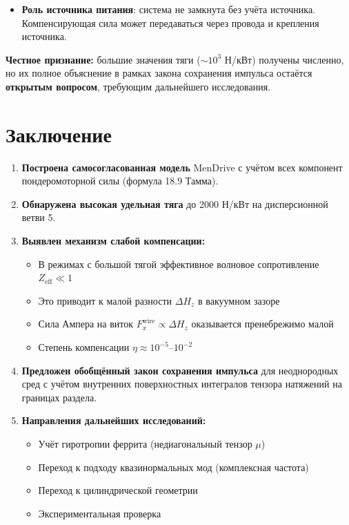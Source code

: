 \documentclass[a4paper,12pt]{article}
\begin{document}
{\begin{itemize}
    \item \textbf{Роль источника питания}: система не замкнута без учёта
    источника. Компенсирующая сила может передаваться через провода и
    крепления источника.
\end{itemize}

\textbf{Честное признание:} большие значения тяги ($\sim 10^3$ Н/кВт)
получены численно, но их полное объяснение в рамках закона сохранения
импульса остаётся \textbf{открытым вопросом}, требующим дальнейшего
исследования.

\section{Заключение}

\begin{enumerate}
    \item \textbf{Построена самосогласованная модель} MenDrive с учётом всех
    компонент пондеромоторной силы (формула 18.9 Тамма).
    
    \item \textbf{Обнаружена высокая удельная тяга} до 2000 Н/кВт на
    дисперсионной ветви 5.
    
    \item \textbf{Выявлен механизм слабой компенсации:}
    \begin{itemize}
        \item В режимах с большой тягой эффективное волновое сопротивление
        $Z_{\text{eff}} \ll 1$
        \item Это приводит к малой разности $\Delta H_z$ в вакуумном зазоре
        \item Сила Ампера на виток $F_x^{\text{wire}} \propto \Delta H_z$ 
        оказывается пренебрежимо малой
        \item Степень компенсации $\eta \approx 10^{-5}$--$10^{-2}$
    \end{itemize}
    
    \item \textbf{Предложен обобщённый закон сохранения импульса} для
    неоднородных сред с учётом внутренних поверхностных интегралов тензора
    натяжений на границах раздела.
    
    \item \textbf{Направления дальнейших исследований:}
    \begin{itemize}
        \item Учёт гиротропии феррита (недиагональный тензор $\mu$)
        \item Переход к подходу квазинормальных мод (комплексная частота)
        \item Переход к цилиндрической геометрии
        \item Экспериментальная проверка
    \end{itemize}
\end{enumerate}

}
\end{document}
